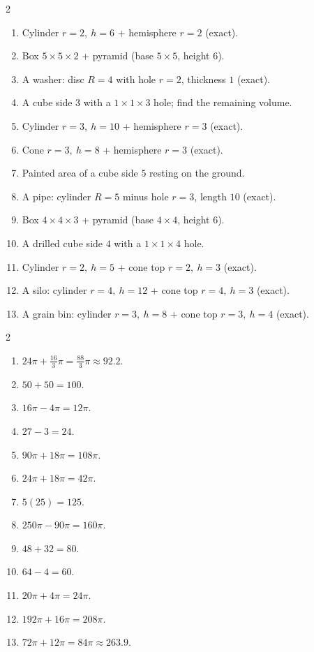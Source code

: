 \documentclass[11pt]{article}
\begin{document}
\begin{recapbox}
\begin{multicols}{2}
\small
\begin{enumerate}[leftmargin=*,itemsep=3pt]
  \item Cylinder $r=2,\ h=6$ + hemisphere $r=2$ (exact).
  \item Box $5\times5\times2$ + pyramid (base $5\times5$, height $6$).
  \item A washer: disc $R=4$ with hole $r=2$, thickness $1$ (exact).
  \item A cube side $3$ with a $1\times1\times3$ hole; find the remaining volume.
  \item Cylinder $r=3,\ h=10$ + hemisphere $r=3$ (exact).
  \item Cone $r=3,\ h=8$ + hemisphere $r=3$ (exact).
  \item Painted area of a cube side $5$ resting on the ground.
  \item A pipe: cylinder $R=5$ minus hole $r=3$, length $10$ (exact).
  \item Box $4\times4\times3$ + pyramid (base $4\times4$, height $6$).
  \item A drilled cube side $4$ with a $1\times1\times4$ hole.
  \item Cylinder $r=2,\ h=5$ + cone top $r=2,\ h=3$ (exact).
  \item A silo: cylinder $r=4,\ h=12$ + cone top $r=4,\ h=3$ (exact).
  \item A grain bin: cylinder $r=3,\ h=8$ + cone top $r=3,\ h=4$ (exact).
\end{enumerate}
\end{multicols}
\end{recapbox}

\begin{keybox}
\begin{multicols}{2}
\small
\begin{enumerate}[leftmargin=*,itemsep=3pt]
  \item $24\pi+\tfrac{16}{3}\pi=\tfrac{88}{3}\pi\approx92.2$.
  \item $50+50=100$.
  \item $16\pi-4\pi=12\pi$.
  \item $27-3=24$.
  \item $90\pi+18\pi=108\pi$.
  \item $24\pi+18\pi=42\pi$.
  \item $5(25)=125$.
  \item $250\pi-90\pi=160\pi$.
  \item $48+32=80$.
  \item $64-4=60$.
  \item $20\pi+4\pi=24\pi$.
  \item $192\pi+16\pi=208\pi$.
  \item $72\pi+12\pi=84\pi\approx263.9$.
\end{enumerate}
\end{multicols}
\end{keybox}
\end{document}
